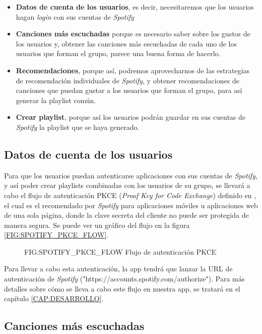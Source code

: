 \begin{itemize}
  \item \textbf{Datos de cuenta de los usuarios}, es decir, necesitaremos que los usuarios hagan 
  \textit{login} con sus cuentas de \textit{Spotify} 
  \item \textbf{Canciones más escuchadas} porque es necesario saber sobre los gustos de los usuarios y,
  obtener las canciones más escuchadas de cada uno de los usuarios que forman el grupo, parece una buena forma de hacerlo.
  \item \textbf{Recomendaciones}, porque así, podremos aprovecharnos de las estrategias de recomendación 
  individuales de \textit{Spotify}, y obtener recomendaciones de canciones que puedan gustar a los usuarios 
  que forman el grupo, para así generar la playlist común.
  \item \textbf{Crear playlist}, porque así los usuarios podrán guardar en sus cuentas de \textit{Spotify} la
  playlist que se haya generado.
\end{itemize}

\subsection{Datos de cuenta de los usuarios\label{subsec:datos_cuenta_usuarios}}

Para que los usuarios puedan autenticarse aplicaciones con sus cuentas de \textit{Spotify}, y así poder crear playlists 
combinadas con los usuarios de su grupo, se llevará a cabo el flujo de autenticación PKCE 
(\textit{Proof Key for Code Exchange}) definido en \cite{spotify_pkce}, el cual es el recomendado por 
\textit{Spotify} para aplicaciones móviles u aplicaciones web de una sola página, donde la clave secreta
del cliente no puede ser protegida de manera segura. Se puede ver un gráfico del flujo en la figura \ref{FIG:SPOTIFY_PKCE_FLOW}.

\begin{figure}[Flujo de autenticación PKCE]{FIG:SPOTIFY_PKCE_FLOW}
    {Flujo de autenticación PKCE}
\end{figure}

Para llevar a cabo esta autenticación, la app tendrá que lanzar la URL de autenticación de \textit{Spotify}
("https://accounts.spotify.com/authorize"). Para más detalles sobre cómo se lleva a cabo este flujo en nuestra app, se tratará en 
el capítulo \ref{CAP:DESARROLLO}.

\subsection{Canciones más escuchadas\label{subsec:canciones_mas_escuchadas}}

